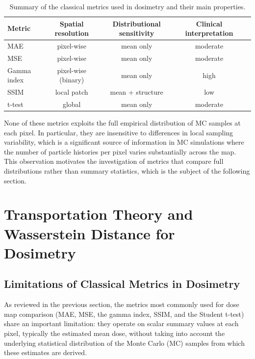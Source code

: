 \documentclass[12pt]{article}
\begin{document}
\begin{table}[h]
\centering
\begin{tabular}{lcccc}
\hline
\textbf{Metric} & \textbf{Spatial resolution} & \textbf{Distributional sensitivity} & \textbf{Clinical interpretation} \\
\hline
MAE   & pixel-wise   & mean only   & moderate \\
MSE   & pixel-wise   & mean only   & moderate \\
Gamma index & pixel-wise (binary) & mean only & high \\
SSIM  & local patch  & mean + structure & low  \\
t-test & global      & mean only   & moderate \\
\hline
\end{tabular}
\caption{Summary of the classical metrics used in dosimetry and their main properties.}
\label{tab:metrics_summary}
\end{table}

None of these metrics exploits the full empirical distribution of MC samples at each pixel.
In particular, they are insensitive to differences in local sampling variability, which is a
significant source of information in MC simulations where the number of particle histories
per pixel varies substantially across the map. This observation motivates the investigation of
metrics that compare full distributions rather than summary statistics, which is the subject of
the following section.

\newpage

\section{Transportation Theory and Wasserstein Distance for Dosimetry}

\subsection{Limitations of Classical Metrics in Dosimetry}

As reviewed in the previous section, the metrics most commonly used for dose map
comparison (MAE, MSE, the gamma index, SSIM, and the Student t-test) share an
important limitation: they operate on scalar summary values at each pixel, typically
the estimated mean dose, without taking into account the underlying statistical
distribution of the Monte Carlo (MC) samples from which these estimates are derived.
\end{document}
